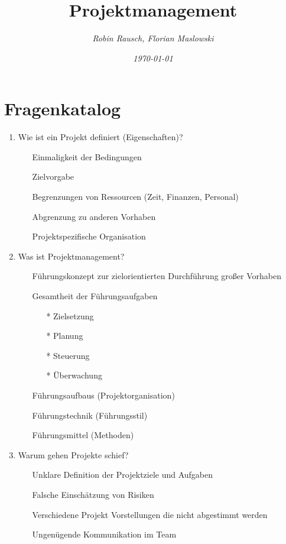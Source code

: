 \documentclass[12pt,a4paper]{article}
\author{\slshape Robin Rausch, Florian Maslowski}
\title{Projektmanagement}
\date{\slshape \today}
\begin{document}
\maketitle
\tableofcontents
\newpage
\section{Fragenkatalog}
\begin{enumerate}
\item Wie ist ein Projekt definiert (Eigenschaften)?
	\begin{enumerate}
	\item[] Einmaligkeit der Bedingungen 
	\item[] Zielvorgabe 
	\item[] Begrenzungen von Ressourcen (Zeit, Finanzen, Personal)
	\item[] Abgrenzung zu anderen Vorhaben 
	\item[] Projektspezifische Organisation 
	\end{enumerate}
\item Was ist Projektmanagement?
	\begin{enumerate}
	\item[] Führungskonzept zur zielorientierten Durchführung großer Vorhaben 
	\item[] Gesamtheit der Führungsaufgaben 
		\begin{enumerate}
		\item[*] Zielsetzung
		\item[*] Planung
		\item[*] Steuerung
		\item[*] Überwachung
		\end{enumerate}
	\item[] Führungsaufbaus (Projektorganisation)
	\item[] Führungstechnik (Führungsstil) 
	\item[] Führungsmittel (Methoden) 
	\end{enumerate}
\item Warum gehen Projekte schief?
	\begin{enumerate}
	\item[] Unklare Definition der Projektziele und Aufgaben 
	\item[] Falsche Einschätzung von Risiken 
	\item[] Verschiedene Projekt Vorstellungen die nicht abgestimmt werden  
	\item[] Ungenügende Kommunikation im Team 
	\end{enumerate}

\end{enumerate}
\end{document}
